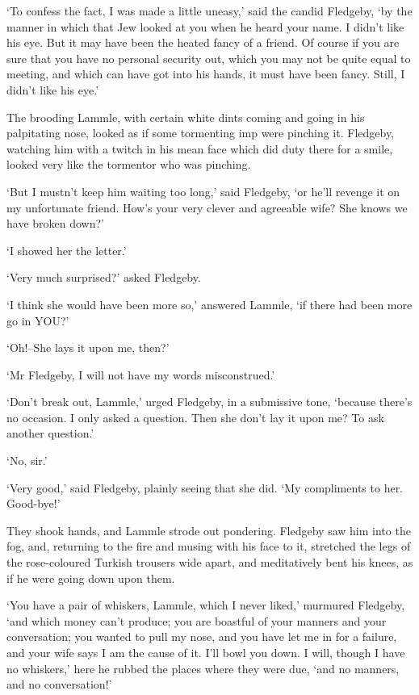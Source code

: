 ‘To confess the fact, I was made a little uneasy,’ said the candid
Fledgeby, ‘by the manner in which that Jew looked at you when he heard
your name. I didn’t like his eye. But it may have been the heated
fancy of a friend. Of course if you are sure that you have no personal
security out, which you may not be quite equal to meeting, and which can
have got into his hands, it must have been fancy. Still, I didn’t like
his eye.’

The brooding Lammle, with certain white dints coming and going in his
palpitating nose, looked as if some tormenting imp were pinching it.
Fledgeby, watching him with a twitch in his mean face which did duty
there for a smile, looked very like the tormentor who was pinching.

‘But I mustn’t keep him waiting too long,’ said Fledgeby, ‘or he’ll
revenge it on my unfortunate friend. How’s your very clever and
agreeable wife? She knows we have broken down?’

‘I showed her the letter.’

‘Very much surprised?’ asked Fledgeby.

‘I think she would have been more so,’ answered Lammle, ‘if there had
been more go in YOU?’

‘Oh!--She lays it upon me, then?’

‘Mr Fledgeby, I will not have my words misconstrued.’

‘Don’t break out, Lammle,’ urged Fledgeby, in a submissive tone,
‘because there’s no occasion. I only asked a question. Then she don’t
lay it upon me? To ask another question.’

‘No, sir.’

‘Very good,’ said Fledgeby, plainly seeing that she did. ‘My compliments
to her. Good-bye!’

They shook hands, and Lammle strode out pondering. Fledgeby saw him
into the fog, and, returning to the fire and musing with his face to it,
stretched the legs of the rose-coloured Turkish trousers wide apart, and
meditatively bent his knees, as if he were going down upon them.

‘You have a pair of whiskers, Lammle, which I never liked,’ murmured
Fledgeby, ‘and which money can’t produce; you are boastful of your
manners and your conversation; you wanted to pull my nose, and you have
let me in for a failure, and your wife says I am the cause of it. I’ll
bowl you down. I will, though I have no whiskers,’ here he rubbed the
places where they were due, ‘and no manners, and no conversation!’

